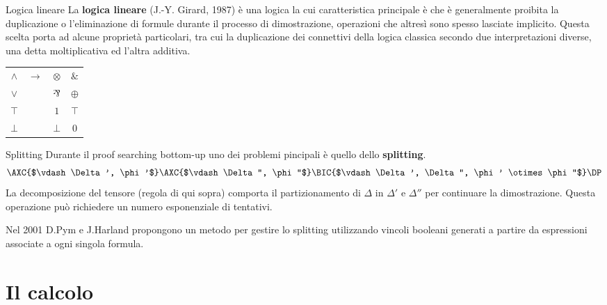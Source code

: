 \documentclass{beamer}
\newcommand{\llpar}{\rotatebox[origin=c]{180}{$\&$}}
\newcommand{\llten}{\otimes}
\newcommand{\llwith}{\&}
\newcommand{\llplus}{\oplus}
\newcommand{\llbot}{\bot}
\newcommand{\lltop}{\top}
\newcommand{\llone}{1}
\newcommand{\llzero}{0}
\begin{document}
\begin{frame}{Logica lineare}
	La \textbf{logica lineare} (J.-Y. Girard, 1987) è una logica la cui caratteristica principale è che è generalmente proibita la duplicazione o l'eliminazione di formule durante il processo di dimostrazione, operazioni che altresì sono spesso lasciate implicito.
	Questa scelta porta ad alcune proprietà particolari, tra cui la duplicazione dei connettivi della logica classica secondo due interpretazioni diverse, una detta moltiplicativa ed l'altra additiva.
	\begin{center}
		\begin{tabular}{cccc}
			$\wedge$ &\multirow{4}{.3cm}{$\rightarrow$} & $\llten$ & $\llwith$ \\
			$\vee$   &                                  & $\llpar$ & $\llplus$ \\
			$\top$   &                                  & $\llone$ & $\lltop$ \\
			$\bot$   &                                  & $\llbot$ & $\llzero$ \\
		\end{tabular}
	\end{center}
\end{frame}
\begin{frame}{Splitting}
	Durante il proof searching bottom-up uno dei problemi pincipali è quello dello \textbf{splitting}.
	$$
	\AXC{$\vdash \Delta', \phi'$}
	\AXC{$\vdash \Delta'', \phi''$}
	\LeftLabel{$\llten$}
	\BIC{$\vdash \Delta', \Delta'', \phi' \llten \phi''$}
	\DP
	$$
	La decomposizione del tensore (regola di qui sopra) comporta il partizionamento di $\Delta$ in $\Delta'$ e $\Delta''$ per continuare la dimostrazione.
	Questa operazione può richiedere un numero esponenziale di tentativi.

	Nel 2001 D.Pym e J.Harland propongono un metodo per gestire lo splitting utilizzando vincoli booleani generati a partire da espressioni associate a ogni singola formula.
\end{frame}

\section{Il calcolo}

% 

% 
\end{document}
